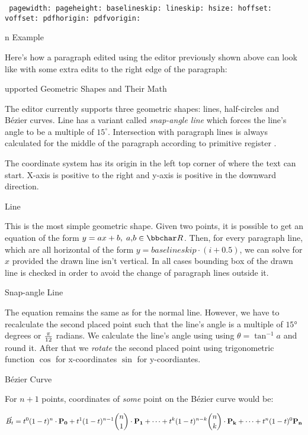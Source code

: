 {\tt
	\nl
	pagewidth: \the\pagewidth \nl
	pageheight: \the\pageheight \nl
	baselineskip: \the\baselineskip \nl
	lineskip: \the\lineskip \nl
	hsize: \the\hsize \nl
	hoffset: \the\hoffset \nl
	voffset: \the\voffset \nl
	pdfhorigin: \the\pdfhorigin \nl
	pdfvorigin: \the\pdfvorigin \nl
}
\endmulti

\subtitle An Example

Here's how a paragraph edited using the editor previously shown above can look like
with some extra edits to the right edge of the paragraph:

\exampleparshape
\loremonepar

\subtitle Supported Geometric Shapes and Their Math

The editor currently supports three geometric shapes: lines, half-circles and Bézier curves.
Line has a variant called {\it snap-angle line} which forces the line's angle to be
a multiple of $15^{\circ}$.
Intersection with paragraph lines is always calculated for the middle of the paragraph
according to primitive register .

The coordinate system has its origin in the left top corner of where the text can start.
X-axis is positive to the right and y-axis is positive in the downward direction.

\curvetitle Line

This is the most simple geometric shape. Given two points, it is possible to get an equation
of the form $y = ax + b,\;a,\!b \in {\bbchar R}$. Then, for every paragraph line, which are all
horizontal of the form $y = baselineskip \cdot (i + 0.5)$, we can solve for $x$
provided the drawn line isn't vertical. In all cases bounding box of the drawn line is checked
in order to avoid the change of paragraph lines outside it.

\curvetitle Snap-angle Line

The equation remains the same as for the normal line. However, we have to recalculate the second placed
point such that the line's angle is a multiple of $\ang{15}$ degrees or $\pi \over 12$ radians.
We calculate the line's angle using using $\theta = \tan^{-1}{a}$ and round it.
After that we {\it rotate} the second placed point using trigonometric function
$\cos$ for x-coordinates $\sin$ for y-coordiantes.

\curvetitle Bézier Curve

For $n+1$ points, coordinates of {\it some} point on the Bézier curve would be:

$$
\vec{B_t} =
t^0 (1-t)^n \cdot {\bf P_0} +
t^1 (1-t)^{n-1} {n \choose 1} \cdot {\bf P_1} +
\cdots +
t^k (1-t)^{n-k} {n \choose k} \cdot {\bf P_k} +
\cdots +
t^n (1-t)^0 {\bf P_n}
$$

